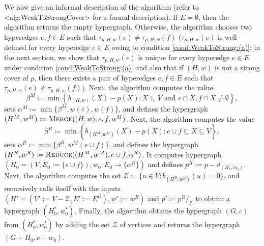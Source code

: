 \documentclass{article}
\def\Cref#1{<#1>}%
\newcommand{\zeros}{\ensuremath{\mathcal{Z}}\xspace}
\newcommand{\functionContract}[2]{\ensuremath{{#1}/_{#2}}\xspace}
\newcommand{\maximalTightSetContainingHyperedge}[1]{\ensuremath{\tau_{#1}}\xspace}
\newcommand{\merge}{\ensuremath{\textsc{Merge}}\xspace}
\newcommand{\reduce}{\ensuremath{\textsc{Reduce}}\xspace}
\begin{document}
We now give an informal description of the algorithm (refer to \Cref{alg:WeakToStrongCover} for a formal description). If $E=\emptyset$, then the algorithm returns the empty hypergraph. Otherwise, the algorithm chooses two hyperedges $e, f \in E$  such that $\maximalTightSetContainingHyperedge{p, H, w}(e)\neq \maximalTightSetContainingHyperedge{p, H, w}(f)$ ($\maximalTightSetContainingHyperedge{p, H, w}(e)$ is well-defined for every hyperedge $e\in E$ owing to condition \ref{cond:WeakToStrong:(a)}; in the next section, we show that $\maximalTightSetContainingHyperedge{p, H, w}(e)$ is unique for every hyperedge $e\in E$ under condition \ref{cond:WeakToStrong:(a)} and also that if $(H, w)$ is not a strong cover of $p$, then there exists a pair of hyperedges $e, f\in E$ such that $\maximalTightSetContainingHyperedge{p, H, w}(e)\neq \maximalTightSetContainingHyperedge{p, H, w}(f)$). 
Next, 
the algorithm computes the value 
 $$\beta^M \coloneqq  \min\left\{b_{(H,w)}(X) - p(X) : X \subseteq V \text{ and } e \cap X, f \cap X \not = \emptyset\right\},$$ sets $\alpha^M \coloneqq  \min\{\beta^M, w(e), w(f)\}$, and defines the hypergraph $(H^M, w^M) := \merge((H, w), e, f, \alpha^M)$.
Next, the algorithm computes the value $$\beta^R \coloneqq  \min\left\{b_{(H^M, w^M)}\left(X\right) - p\left(X\right) : e \cup f \subseteq X \subseteq V\right\},$$ 
    sets $\alpha^R \coloneqq  \min\{\beta^R, w^M(e\cup f)\}$, and defines the hypergraph $(H^R, w^R) := \reduce((H^M, w^M), e \cup f, \alpha^R)$.
It computes hypergraph $(H_0=(V, E_0:=\{e\cup f\}), w_0: E_0\rightarrow \{\alpha^R\})$ and defines $p^R:=p-d_{(H_0, w_0)}$. 
Next, the algorithm computes the set $\zeros \coloneqq  \{u \in V : b_{(H^R, w^R)}(u) = 0\}$, and recursively calls itself with the inputs 
    $(H' = (V':=V-\zeros, E':=E^R),w':=w^R) $ and $p' \coloneqq  \functionContract{p^R}{\zeros}$ to obtain a hypergraph $\left(H_0^*, w_0^*\right)$. Finally, the algorithm obtains the hypergraph $(G, c)$ from $(H_0^*, w_0^*)$ by adding the set $\zeros$ of vertices and returns the hypergraph $(G+H_0, c + w_0)$.
\end{document}
